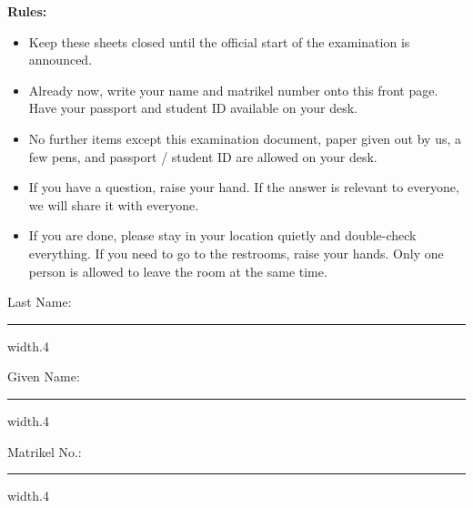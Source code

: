 {\begin{center}
  \end{center}
      {\small
        \textbf{Rules: }
        \begin{itemize}
        \item Keep these sheets closed until the official start of the examination is announced.
        \item Already now, write your name and matrikel number onto this front page. Have your passport and student ID available on your desk.
        \item No further items except this examination document, paper given out by us, a few pens, and passport / student ID are allowed on your desk.
        \item If you have a question, raise your hand. If the answer is relevant to everyone, we will share it with everyone.
        \item If you are done, please stay in your location quietly and double-check everything. If you need to go to the restrooms, raise your hands. Only one person is allowed to leave the room at the same time.
        \end{itemize}
     
        \par\vspace{1em}  

        \normalsize
        \parbox[t][2em][t]{.3\textwidth}{\flushright\large Last Name:\hspace*{1em}}\parbox[t][2em][b]{.6\textwidth}{\hrule width.4\textwidth} \par
        \parbox[t][2em][t]{.3\textwidth}{\flushright\large Given Name:\hspace*{1em}}\parbox[t][2em][b]{.6\textwidth}{\hrule width.4\textwidth} \par
        \parbox[t][2em][t]{.3\textwidth}{\flushright\large Matrikel No.:\hspace*{1em}}\parbox[t][2em][b]{.6\textwidth}{\hrule width.4\textwidth} \par
        \vspace{2em}
        
      }
  }
  \clearpage
\fi



